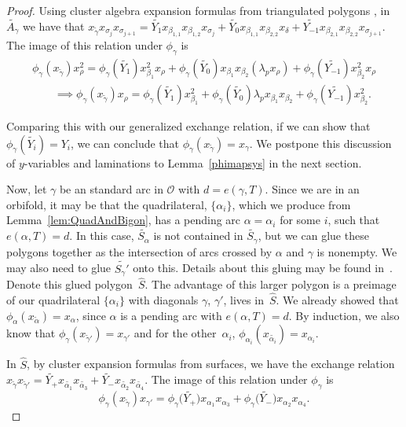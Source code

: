 \documentclass[pdftex]{sigma}%
\numberwithin{equation}{section}
\begin{document}
\begin{proof}
Using cluster algebra expansion formulas from triangulated polygons \cite{MSW}, in $\widetilde{A_\gamma}$ we have that $x_{\widetilde{\gamma}}x_{\sigma_j}x_{\sigma_{j+1}} = \widetilde{Y_1} x_{\beta_{1,1}}x_{\beta_{1,2}}x_{\sigma_j} + \widetilde{Y_0} x_{\beta_{1,1}}x_{\beta_{2,2}}x_{\delta} + \widetilde{Y_{-1}}x_{\beta_{2,1}}x_{\beta_{2,2}}x_{\sigma_{j+1}}$. The image of this relation under $\phi_\gamma$ is
\begin{gather}
\phi_\gamma(x_{\widetilde{\gamma}})x_{\rho}^2 = \phi_\gamma(\widetilde{Y_1}) x_{\beta_1}^2x_{\rho} + \phi_\gamma(\widetilde{Y_0}) x_{\beta_1}x_{\beta_2}(\lambda_px_\rho)+ \phi_\gamma(\widetilde{Y_{-1}})x_{\beta_2}^2x_{\rho}\nonumber
\\
\qquad{} \implies\phi_\gamma(x_{\widetilde{\gamma}})x_{\rho} = \phi_\gamma(\widetilde{Y_1}) x_{\beta_1}^2 +\phi_\gamma(\widetilde{Y_0}) \lambda_px_{\beta_1}x_{\beta_2}+ \phi_\gamma(\widetilde{Y_{-1}})x_{\beta_2}^2.\label{genmutate}
\end{gather}

Comparing this with our generalized exchange relation, if we can show that $\phi_\gamma(\widetilde{Y_i}) = Y_i$, we can conclude that $\phi_\gamma(x_{\widetilde{\gamma}}) = x_\gamma$. We postpone this discussion of $y$-variables and laminations to Lemma~\ref{phimapsys} in the next section.

Now, let $\gamma$ be an standard arc in $\mathcal{O}$ with $d = e(\gamma, T)$. Since we are in an orbifold, it may be that the quadrilateral, $\{\alpha_i\}$, which we produce from Lemma~\ref{lem:QuadAndBigon}, has a pending arc $\alpha = \alpha_i$ for some $i$, such that $e(\alpha,T) = d$. In this case, $\widetilde{S_\alpha}$ is not contained in $\widetilde{S_\gamma}$, but we can glue these polygons together as the intersection of arcs crossed by $\alpha$ and $\gamma$ is nonempty. We may also need to glue $\widetilde{S_\gamma'}$ onto this. Details about this gluing may be found in~\cite{MSW}. Denote this glued polygon~$\hat{S}$. The advantage of this larger polygon is a preimage of our quadrilateral $\{\alpha_i\}$ with diagonals $\gamma$, $\gamma'$, lives in~$\hat{S}$. We already showed that $\phi_\alpha(x_{\widetilde{\alpha}}) = x_\alpha$, since $\alpha$ is a pending arc with $e(\alpha,T) = d$. By induction, we also know that $\phi_{\gamma}(x_{\widetilde{\gamma}'}) = x_{\gamma'}$ and for the other~$\alpha_i$, $\phi_{\alpha_i}(x_{\widetilde{\alpha_i}}) = x_{\alpha_i}$.

In $\hat{S}$, by cluster expansion formulas from surfaces, we have the exchange relation $x_{\widetilde{\gamma}} x_{\widetilde{\gamma}'}= \widetilde{Y_+}x_{\widetilde{\alpha_1}}x_{\widetilde{\alpha_3}} + \widetilde{Y_-}x_{\widetilde{\alpha_2}}x_{\widetilde{\alpha_4}}$. The image of this relation under $\phi_\gamma$ is \[
\phi_\gamma(x_{\widetilde{\gamma}}) x_{\gamma'} = \phi_\gamma\big(\widetilde{Y_+}\big)x_{\alpha_1}x_{\alpha_3} + \phi_\gamma\big(\widetilde{Y_-}\big)x_{\alpha_2}x_{\alpha_4}.
\]


\end{proof}
\end{document}
